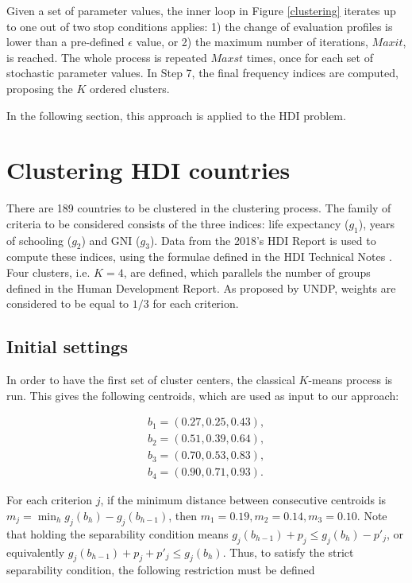 \documentclass[]{elsarticle}
\theoremstyle{definition}
\begin{document}
Given a set of parameter values, the inner loop in Figure \ref{clustering} iterates up to one out of two stop conditions applies: 1) the change of evaluation profiles is  lower than a pre-defined $\epsilon$ value, or 2) the maximum number of iterations, $Maxit$,  is reached.  The whole process is repeated $Maxst$ times, once for each set of stochastic parameter values. In Step 7, the final frequency indices are computed, proposing the $K$ ordered clusters.


  

In the following section, this approach is applied to the HDI problem.





\section{Clustering HDI countries}\label{application}

There are 189 countries to be clustered in the clustering process. The family of criteria to be considered consists of the three indices: life expectancy ($g_1$), years of schooling ($g_2$) and GNI  ($g_3$).  Data from the 2018's HDI Report is used to compute these indices, using the formulae defined in the HDI Technical Notes \citep{UNDP2019}. Four clusters, i.e. $K=4$, are defined, which parallels the number of groups defined in the Human Development Report.  As proposed by UNDP, weights are considered to be equal to $1/3$ for each criterion.

\subsection{Initial settings}

In order to have the first set of cluster centers, the classical $K$-means process is run. This gives the following centroids, which are used as input to our approach:

\begin{eqnarray}
b_1=(0.27, 0.25, 0.43), \nonumber\\
b_2=(0.51, 0.39, 0.64), \nonumber\\
b_3=(0.70, 0.53, 0.83), \nonumber\\
b_4=(0.90, 0.71, 0.93). \nonumber
\end{eqnarray}

\noindent
For each criterion $j$, if the minimum distance between consecutive centroids is $m_j=\min_{h} g_j(b_h)-g_j(b_{h-1})$, then $m_1=0.19, m_2=0.14, m_3=0.10$. Note that holding the separability condition means  $g_j(b_{h-1})+p_j \leq g_j(b_h)-p'_j$, or equivalently $g_j(b_{h-1})+p_j+p'_j \leq g_j(b_h)$. Thus, to satisfy the strict separability condition, the following restriction must be defined
\end{document}
